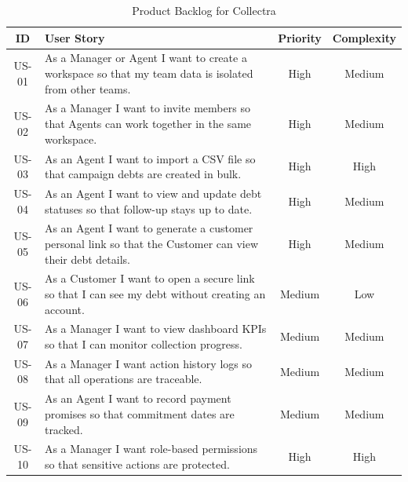 \documentclass[12pt,a4paper]{report}
\begin{document}
\begin{table}[H]
  \centering
  \renewcommand{\arraystretch}{1.35}
  \begin{tabular}{|c|p{8.8cm}|c|c|}
    \hline
    \textbf{ID} & \textbf{User Story} & \textbf{Priority} & \textbf{Complexity} \\
    \hline
    US-01 & As a Manager or Agent I want to create a workspace so that my team data is isolated from other teams.                           & High   & Medium \\
    \hline
    US-02 & As a Manager I want to invite members so that Agents can work together in the same workspace.                                  & High   & Medium \\
    \hline
    US-03 & As an Agent I want to import a CSV file so that campaign debts are created in bulk.                                            & High   & High \\
    \hline
    US-04 & As an Agent I want to view and update debt statuses so that follow-up stays up to date.                                        & High   & Medium \\
    \hline
    US-05 & As an Agent I want to generate a customer personal link so that the Customer can view their debt details.                      & High   & Medium \\
    \hline
    US-06 & As a Customer I want to open a secure link so that I can see my debt without creating an account.                             & Medium & Low \\
    \hline
    US-07 & As a Manager I want to view dashboard KPIs so that I can monitor collection progress.                                         & Medium & Medium \\
    \hline
    US-08 & As a Manager I want action history logs so that all operations are traceable.                                                  & Medium & Medium \\
    \hline
    US-09 & As an Agent I want to record payment promises so that commitment dates are tracked.                                            & Medium & Medium \\
    \hline
    US-10 & As a Manager I want role-based permissions so that sensitive actions are protected.                                            & High   & High \\
    \hline
  \end{tabular}
  \caption{Product Backlog for Collectra}
  \label{tab:backlog}
\end{table}
\end{document}

